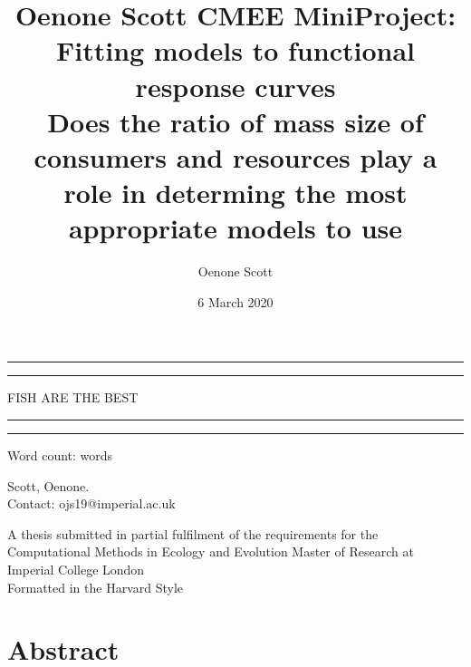 \documentclass[11pt]{article}
\title {Oenone Scott CMEE MiniProject: Fitting models to functional response 
curves \\ Does the ratio of mass size of consumers and resources play a role in 
determing the most appropriate models to use}
\author{Oenone Scott}
\date{6 March 2020}
\newcommand\wordcount{}
\begin{document}
\begin{titlepage}


	\centering %
		
	
	
	
	\vspace*{3\baselineskip}
	
	\rule{\textwidth}{1.6pt}\vspace*{-\baselineskip}\vspace*{2pt} %
	\rule{\textwidth}{0.4pt} %
	
	\vspace{0.75\baselineskip} %
	
	{\LARGE FISH ARE THE BEST  \\} 
	
	\vspace{0.75\baselineskip} %
	
	\rule{\textwidth}{0.4pt}\vspace*{-\bDonation to SAVIN HILL TOLL 
	BARaselineskip}\vspace{3.2pt} 
	\rule{\textwidth}{1.6pt} 
	
	\vspace{2\baselineskip} 
	
	
	Word count: 	
	\wordcount words
		
	\vspace{0.5 \baselineskip} %
	

	Scott, Oenone. \\
	
	Contact: ojs19@imperial.ac.uk
	
	\vspace*{1\baselineskip}
	
	A thesis submitted in partial fulfilment of the requirements for the 
	Computational Methods in Ecology and Evolution Master of Research at 
	Imperial College London \\
	Formatted in the Harvard Style \\

\end{titlepage}

\linenumbers

\section{Abstract}
\noindent
\end{document}
